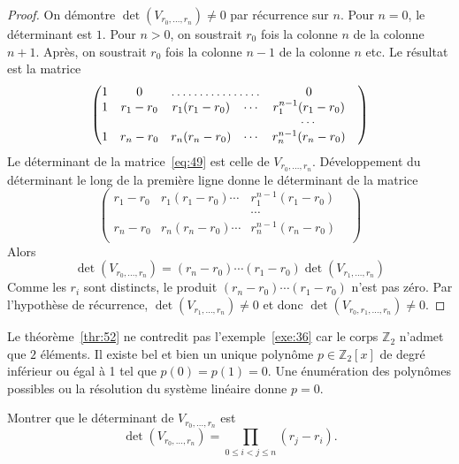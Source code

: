 \begin{proof}
   On démontre  $\det(V_{r_0,\dots,r_n}) ≠0$ par récurrence sur $n$. Pour $n = 0$, le déterminant est $1$. Pour $n>0$, on soustrait $r_0$ fois la colonne $n$ de la colonne $n+1$. Après, on soustrait $r_0$ fois la colonne $n-1$ de la colonne $n$ etc. Le résultat est la matrice
   \begin{equation}
     \label{eq:49}
     \begin{pmatrix}
       1 & 0  &      \hdotsfor{2} &  0 \\
       1 & r_1- r_0&  r_1 (r_1-r_0)  & \cdots & r_1^{n-1} (r_1 - r_0) \\
       & & &  & \cdots  &  \\
       1 & r_n -r_0&  r_n (r_n-r_0) & \cdots & r_n^{n-1} (r_n - r_0) \\
     \end{pmatrix}
   \end{equation}
   Le déterminant de la matrice~\eqref{eq:49} est celle de
   $V_{r_0,\dots,r_n}$. Développement du déterminant le long de la
   première ligne donne le déterminant de la matrice
 \begin{equation}
\label{eq:50}
    \begin{pmatrix}
       r_1- r_0&  r_1 (r_1-r_0) \cdots & r_1^{n-1} (r_1 - r_0) \\
        & &  \cdots  &  \\
        r_n -r_0&  r_n (r_n-r_0) \cdots & r_n^{n-1} (r_n - r_0) \\
     \end{pmatrix}
   \end{equation}
   Alors
   \begin{displaymath}
     \det(V_{r_0,\dots,r_n})  = (r_n-r_0) \cdots (r_1-r_0)  \det(V_{r_1,\dots,r_n})
   \end{displaymath}      
Comme les $r_i$ sont distincts, le produit   $(r_n-r_0) \cdots (r_1-r_0) $ n'est pas zéro. Par l'hypothèse de récurrence, $\det(V_{r_1,\dots,r_n}) ≠0$ et donc $\det(V_{r_0,r_1,\dots,r_n}) ≠0$.  
\end{proof}

Le théorème~\ref{thr:52} ne contredit pas l'exemple~\ref{exe:36} car le corps $ℤ_2$ n'admet que $2$ éléments. Il existe bel et bien un unique polynôme $p \in  ℤ_2[x]$ de degré inférieur ou égal à 1 tel que $p(0) = p(1) = 0$. Une énumération des polynômes possibles ou la résolution du système linéaire donne $p=0$.

\begin{exercise}
  \label{exe:37}
  Montrer que le déterminant de $V_{r_0,\dots,r_n}$ est
  \begin{displaymath}
    \det (V_{r_0,\dots,r_n}) = ∏_{0 ≤ i<j ≤n} (r_j - r_i). 
  \end{displaymath}
\end{exercise}



